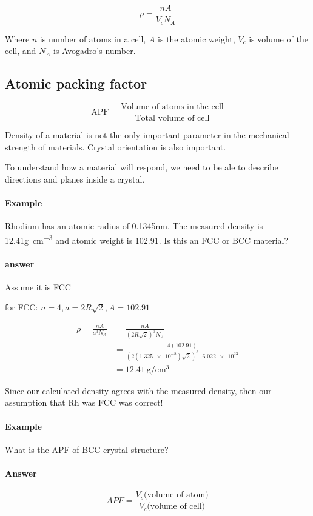 \documentclass{article}
\begin{document}
\begin{equation*}
    \rho = \frac{nA}{V_cN_A}
\end{equation*}

Where $n$ is number of atoms in a cell, $A$ is the atomic weight, $V_c$ is volume of the cell, and $N_A$ is Avogadro's number.

\subsection{Atomic packing factor}
\[\text{APF} = \frac{\text{Volume of atoms in the cell}}{\text{Total volume of cell}}\]

Density of a material is not the only important parameter in the mechanical strength of materials. Crystal orientation is also important.

To understand how a material will respond, we need to be ale to describe directions and planes inside a crystal.

\paragraph{Example} Rhodium has an atomic radius of 0.1345nm. The measured density is 12.41\si{\g\per\cubic\cm} and atomic weight is 102.91. Is this an FCC or BCC material?

\paragraph{answer} Assume it is FCC

for FCC: $n = 4, a = 2R\sqrt{2}, A = 102.91$

\begin{align*}
    \rho = \frac{nA}{a^3N_A}&=\frac{nA}{(2R\sqrt{2})^3N_A}\\
    &= \frac{4(102.91)}{(2(\num{1.325e-8})\sqrt{2})^3\cdot\num{6.022e23}}\\
    &=\SI{12.41}{\g\per\cm\cubed}
\end{align*}

Since our calculated density agrees with the measured density, then our assumption that Rh was FCC was correct!

\paragraph{Example} What is the APF of BCC crystal structure?

\paragraph{Answer} \begin{equation*}
    APF = \frac{V_s\text{(volume of atom)}}{V_c\text{(volume of cell)}}
\end{equation*}
\end{document}
